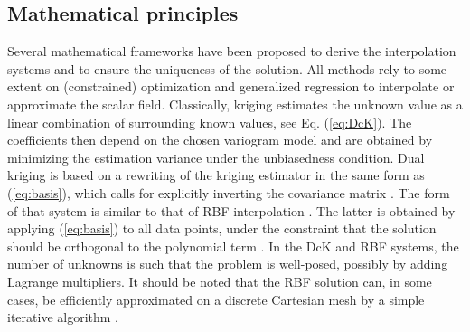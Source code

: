 \documentclass[preprint]{ring20}
\begin{document}
{\subsection{Mathematical principles} 

Several mathematical frameworks have been proposed to derive the interpolation systems and to ensure the uniqueness of the solution. 
All methods rely to some extent on (constrained) optimization and generalized regression to interpolate or approximate the scalar field. Classically, kriging estimates the unknown value as a linear combination of surrounding known values, see Eq. (\ref{eq:DcK}). The coefficients then depend on the chosen variogram model and are obtained by minimizing the estimation variance under the unbiasedness condition. Dual kriging is based on a rewriting of the kriging estimator in the same form as (\ref{eq:basis}), which calls for explicitly inverting the covariance matrix \citep{Lajaunie1997MG,Chiles04OMSMP}. The form of that system is similar to that of RBF interpolation \citep{Dubrule1984CG,Hillier2014MG}. The latter is obtained by applying (\ref{eq:basis}) to all data points, under the constraint that the solution should be orthogonal to the polynomial term \citep{Carr2001,Hillier2014MG}. In the DcK and RBF systems, the number of unknowns is such that the problem is well-posed, possibly by adding Lagrange multipliers. It should be noted that the RBF solution can, in some cases, be efficiently approximated on a discrete Cartesian mesh by a simple iterative algorithm \citep{Park2006ITVCG}. 

}
\end{document}

